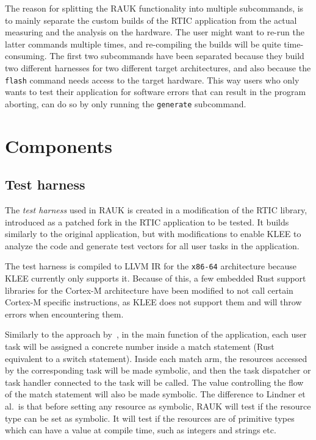 The reason for splitting the RAUK functionality into multiple subcommands, is to
mainly separate the custom builds of the RTIC application from the actual
measuring and the analysis on the hardware. The user might want to re-run the latter
commands multiple times, and re-compiling the builds will be quite
time-consuming. The first two subcommands have been separated because they
build two different harnesses for two different target architectures, and also
because the \texttt{flash} command needs access to the target hardware. This
way users who only wants to test their application for software errors that can
result in the program aborting, can do so by only running the \texttt{generate}
subcommand.

\section{Components}

\subsection{Test harness}
The \emph{test harness} used in RAUK is created in a modification of the RTIC library,
introduced as a patched fork in the RTIC application to be tested. It builds
similarly to the original application, but with modifications to enable KLEE to
analyze the code and generate test vectors for all user tasks in the
application.

The test harness is compiled to LLVM IR for the \texttt{x86-64} architecture
because KLEE currently only supports it. Because of this, a few embedded Rust support
libraries for the Cortex-M architecture have been modified to not call certain
Cortex-M specific instructions, as KLEE does not support them and will throw
errors when encountering them.

Similarly to the approach by~\cite{lindner}, in the main function of the
application, each user task will be assigned a concrete number inside a match
statement (Rust equivalent to a switch statement). Inside each match arm, the
resources accessed by the corresponding task will be made symbolic, and then
the task dispatcher or task handler connected to the task will be called. The
value controlling the flow of the match statement will also be made symbolic.
The difference to Lindner et al.\ is that before setting any resource as
symbolic, RAUK will test if the resource type can be set as symbolic. It
will test if the resources are of primitive types which can have a value at
compile time, such as integers and strings etc.

